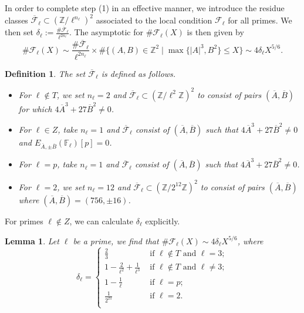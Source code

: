 \documentclass[12pt]{amsart}
\newtheorem{lemma}[theorem]{Lemma}
\newtheorem{definition}[theorem]{Definition}
\newcommand{\cF}{\mathcal{F}}
\newcommand{\Z}{\mathbb{Z}}
\newcommand{\F}{\mathbb{F}}
\newcommand{\op}[1]{\operatorname{#1}}
\numberwithin{equation}{section}
\begin{document}
In order to complete step (1) in an effective manner, we introduce the residue classes $\overline{\cF}_\ell\subset (\Z/\ell^{n_\ell})^2$ associated to the local condition $\cF_\ell$ for all primes. We then set $\delta_\ell:= \frac{\#\overline{\cF}_\ell}{\ell^{2n_\ell}}$. The asymptotic for $\#\cF_\ell(X)$ is then given by 
\[\# \cF_\ell(X)\sim \frac{\# \overline{\cF}_\ell}{\ell^{2n_\ell}}\times \# \{(A, B)\in \Z^2\mid \op{max}\{|A|^3, B^2\}\leq X\}\sim 4\delta_\ell X^{5/6}. \]
\begin{definition}
    The set $\overline{\cF}_\ell$ is defined as follows.
    \begin{itemize}
        \item For $\ell\notin T$, we set $n_\ell=2$ and $\overline{\cF}_\ell\subset (\Z/\ell^2\Z)^2$ to consist of pairs $(\overline{A},\overline{B})$ for which $4\overline{A}^3+27 \overline{B}^2\neq 0$. 
        \item For $\ell\in Z$, take $n_\ell=1$ and $\overline{\cF}_\ell$ consist of $(\overline{A}, \overline{B})$ such that $4\overline{A}^3+27 \overline{B}^2\neq 0$ and $E_{\overline{A}, \pm\overline{B}}(\F_\ell)[p]=0$.
        \item For $\ell=p$, take $n_\ell=1$ and $\overline{\cF}_\ell$ consist of $(\overline{A}, \overline{B})$ such that $4\overline{A}^3+27 \overline{B}^2\neq 0$.
        \item For $\ell=2$, we set $n_\ell=12$ and $\overline{\cF}_\ell\subset (\Z/2^{12}\Z)^2$ to consist of pairs $(\overline{A},\overline{B})$ where $(\overline{A},\overline{B})=(756, \pm 16)$. 
    \end{itemize}
\end{definition}
For primes $\ell\notin Z$, we can calculate $\delta_\ell$ explicitly. 

\begin{lemma}\label{cl lemma}
    Let $\ell$ be a prime, we find that $\# \cF_\ell(X)\sim 4 \delta_\ell X^{5/6}$, where
    \[\delta_\ell= \begin{cases}
      \frac{2}{3}  & \text{ if }\ell\notin T \text{ and }\ell=3;\\
       1-\frac{2}{\ell^2}+\frac{1}{\ell^3}  & \text{ if }\ell\notin T \text{ and }\ell\neq  3;\\
       1-\frac{1}{\ell} & \text{ if }\ell=p;\\
       \frac{1}{2^{21}} & \text{ if }\ell=2.\\
    \end{cases}\]
\end{lemma}
\end{document}
